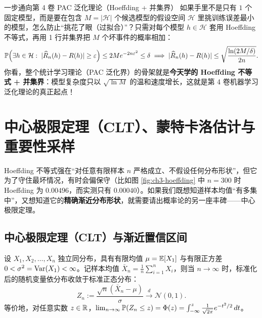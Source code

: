 \begin{insightBox}{一步通向第 4 卷 PAC 泛化理论（Hoeffding + 并集界）}
如果手里不是只有 $1$ 个固定模型，而是要在包含 $M = |\mathcal{H}|$ 个候选模型的假设空间 $\mathcal{H}$ 里挑训练误差最小的模型，怎么防止“挑花了眼（过拟合）”？只需对每个模型 $h \in \mathcal{H}$ 套用 Hoeffding 不等式，再用 1 行并集界把 $M$ 个坏事件的概率相加：
\[
  \mathbb{P}\!\left(\exists h \in \mathcal{H}:\; |\widehat{R}_n(h) - R(h)| \ge \varepsilon\right) \le 2 M e^{-2 n \varepsilon^2} \le \delta
  \implies
  |\widehat{R}_n(h) - R(h)| \le \sqrt{\frac{\ln(2M / \delta)}{2n}}.
\]
你看，整个统计学习理论（PAC 泛化界）的骨架就是\textbf{今天学的 Hoeffding 不等式 + 并集界}：模型复杂度只以 $\sqrt{\ln M}$ 的温和速度增长，这就是第 4 卷机器学习泛化理论的真正起点！
\end{insightBox}

\section{中心极限定理（CLT）、蒙特卡洛估计与重要性采样}
\label{sec:ch3-clt-mc}

Hoeffding 不等式强在“对任意有限样本 $n$ 严格成立、不假设任何分布形状”，但它为了守住最坏情况，有时会偏保守（比如图 \ref{fig:ch3-hoeffding} 中 $n=300$ 时 Hoeffding 为 $0.00496$，而实测只有 $0.00040$）。如果我们既想知道样本均值“有多集中”，又想知道它的\textbf{精确渐近分布形状}，就需要请出概率论的另一座丰碑——中心极限定理。

\subsection{中心极限定理（CLT）与渐近置信区间}

\begin{thmBox}
\begin{theorem}
\label{thm:ch3-clt}
设 $X_1, X_2, \dots, X_n$ 独立同分布，具有有限均值 $\mu = \mathbb{E}[X_1]$ 与有限正方差 $0 < \sigma^2 = \operatorname{Var}(X_1) < \infty$。记样本均值 $\bar{X}_n = \frac{1}{n}\sum_{i=1}^n X_i$，则当 $n \to \infty$ 时，标准化后的随机变量依分布收敛于标准正态分布：
\begin{equation}
  Z_n := \frac{\sqrt{n}(\bar{X}_n - \mu)}{\sigma} \xrightarrow{d} \mathcal{N}(0, 1). \label{eq:ch3-clt}
\end{equation}
等价地，对任意实数 $z \in \mathbb{R}$，$\lim_{n\to\infty} \mathbb{P}(Z_n \le z) = \Phi(z) = \int_{-\infty}^z \frac{1}{\sqrt{2\pi}}e^{-t^2/2}\,dt$。
\end{theorem}
\end{thmBox}

